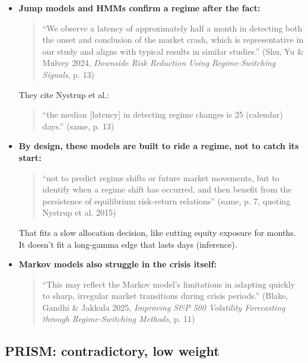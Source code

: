 \documentclass{article}
\begin{document}
\begin{itemize}

\item \textbf{Jump models and HMMs confirm a regime after the fact:}

\begin{quote}``We observe a latency of approximately half a month in detecting both the onset and conclusion of the market crash, which is representative in our study and aligns with typical results in similar studies.'' (Shu, Yu \& Mulvey 2024, \emph{Downside Risk Reduction Using Regime-Switching Signals}, p. 13)\end{quote}

They cite Nystrup et al.:

\begin{quote}``the median [latency] in detecting regime changes is 25 (calendar) days.'' (same, p. 13)\end{quote}

\item \textbf{By design, these models are built to ride a regime, not to catch its start:}

\begin{quote}``not to predict regime shifts or future market movements, but to identify when a regime shift has occurred, and then benefit from the persistence of equilibrium risk-return relations'' (same, p. 7, quoting Nystrup et al. 2015)\end{quote}

That fits a slow allocation decision, like cutting equity exposure for months. It doesn't fit a long-gamma edge that lasts days (inference).

\item \textbf{Markov models also struggle in the crisis itself:}

\begin{quote}``This may reflect the Markov model's limitations in adapting quickly to sharp, irregular market transitions during crisis periods.'' (Blake, Gandhi \& Jakkula 2025, \emph{Improving S\&P 500 Volatility Forecasting through Regime-Switching Methods}, p. 11)\end{quote}

\end{itemize}

\subsection{PRISM: contradictory, low weight}
\end{document}
